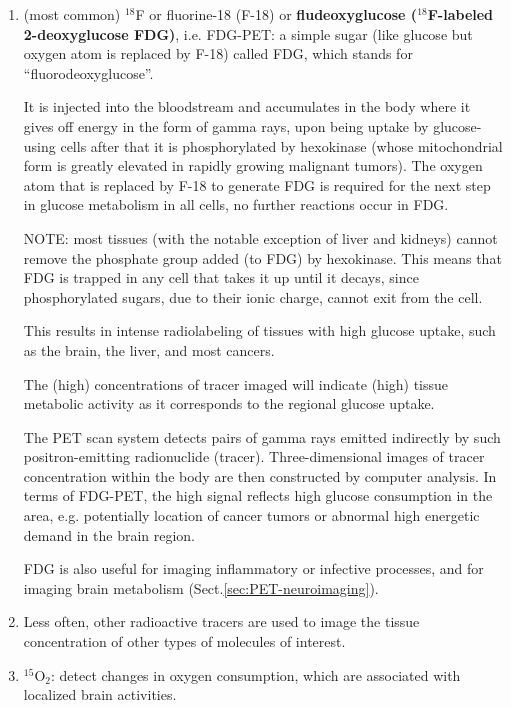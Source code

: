 \begin{enumerate}

  \item (most common) $^{18}$F or fluorine-18 (F-18) or {\bf  fludeoxyglucose
  ($^{18}$F-labeled 2-deoxyglucose FDG)}, i.e.
  FDG-PET: a simple sugar (like glucose but oxygen atom is replaced by F-18)
  called FDG, which stands for “fluorodeoxyglucose”.

  
  It is injected into the bloodstream and accumulates in the body where it gives
off energy in the form of gamma rays, upon being uptake by glucose-using cells
after that it is phosphorylated by hexokinase (whose mitochondrial form is
greatly elevated in rapidly growing malignant tumors). 
The oxygen atom that is replaced by F-18 to generate FDG is required for the
next step in glucose metabolism in all cells, no further reactions occur in FDG.

   
   NOTE: most tissues (with the notable exception of liver and kidneys) cannot
   remove the phosphate group added (to FDG) by hexokinase. This means that FDG
   is trapped in any cell that takes it up until it decays, since phosphorylated
   sugars, due to their ionic charge, cannot exit from the cell.
   
   This results in intense radiolabeling of tissues with high glucose uptake,
   such as the brain, the liver, and most cancers.


The (high) concentrations of tracer imaged will indicate (high) tissue metabolic
activity as it corresponds to the regional glucose uptake.

The PET scan system detects pairs of gamma rays emitted indirectly by such
positron-emitting radionuclide (tracer). Three-dimensional images of tracer
concentration  within the body are then constructed by computer analysis.
In terms of FDG-PET, the high signal reflects high glucose consumption in
the area, e.g. potentially location of cancer tumors or abnormal high energetic
demand in the brain region.

FDG is also useful for imaging inflammatory or infective processes, and for
imaging brain metabolism (Sect.\ref{sec:PET-neuroimaging}).
  
   \item Less often, other radioactive tracers are used to image the tissue
   concentration of other types of molecules of interest.
   
   \item $^{15}$O$_2$: detect changes in oxygen consumption, which are
   associated with localized brain activities.
   

\end{enumerate}
